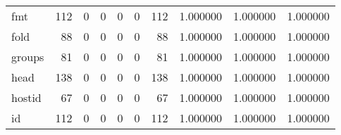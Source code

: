 \begin{longtable}{lrrrrrrrrr}
fmt       &                                   112 &                                                  0 &                                                  0 &                                                  0 &                                                  0 &                                                112 &                                           1.000000 &                               1.000000 &                             1.000000 \\
fold      &                                    88 &                                                  0 &                                                  0 &                                                  0 &                                                  0 &                                                 88 &                                           1.000000 &                               1.000000 &                             1.000000 \\
groups    &                                    81 &                                                  0 &                                                  0 &                                                  0 &                                                  0 &                                                 81 &                                           1.000000 &                               1.000000 &                             1.000000 \\
head      &                                   138 &                                                  0 &                                                  0 &                                                  0 &                                                  0 &                                                138 &                                           1.000000 &                               1.000000 &                             1.000000 \\
hostid    &                                    67 &                                                  0 &                                                  0 &                                                  0 &                                                  0 &                                                 67 &                                           1.000000 &                               1.000000 &                             1.000000 \\
id        &                                   112 &                                                  0 &                                                  0 &                                                  0 &                                                  0 &                                                112 &                                           1.000000 &                               1.000000 &                             1.000000 \\

\end{longtable}
